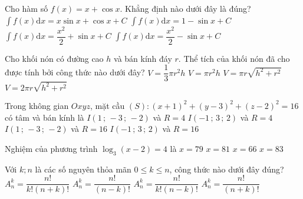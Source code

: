 \begin{ex} %
Cho hàm số $f( x )=x+\cos x$. Khẳng định nào dưới đây là đúng?
\choice 
{ $\int{f( x )\mathrm{d} x}=x\sin x+\cos x+C$}
{ $\int{f( x )\mathrm{d} x}=1-\sin x+C$}
{ \True $\int{f( x )\mathrm{d} x}=\dfrac{x^2}{2}+\sin x+C$}
{ $\int{f( x )\mathrm{d} x}=\dfrac{x^2}{2}-\sin x+C$} 
\end{ex} 
\begin{ex} %
Cho khối nón có đường cao $h$ và bán kính đáy $r$. Thể tích của khối nón đã cho được tính bởi công thức nào dưới đây?
\choice 
{ \True $V=\dfrac{1}{3}\pi {{r}^2}h$}
{ $V=\pi {{r}^2}h$}
{ $V=\pi r\sqrt{{{h}^2}+{{r}^2}}$}
{ $V=2\pi r\sqrt{{{h}^2}+{{r}^2}}$} \end{ex} 
\begin{ex} %
\end{ex} 
\begin{ex} %
Trong không gian $Oxyz$, mặt cầu $( S ):{{( x+1 )}^2}+{{( y-3 )}^2}+{{( z-2 )}^2}=16$ có tâm và bán kính là 
\choice 
{ $I( 1\,;\,-3\,;\,-2 )$ và $R=4$}
{ \True $I( -1\,;\,3\,;\,2 )$ và $R=4$} 
{ $I( 1\,;\,-3\,;\,-2 )$ và $R=16$}
{ $I( -1\,;\,3\,;\,2 )$ và $R=16$} \end{ex} 
\begin{ex} %
Nghiệm của phương trình ${{\log }_{3}}( x-2 )=4$ là
\choice 
{ $x=79$}
{ $x=81$}
{ $x=66$}
{ \True $x=83$} \end{ex} 
\begin{ex} %
Với $k;n$ là các số nguyên thỏa mãn $0\le k\le n$, công thức nào dưới đây đúng?
\choice 
{ $A_{n}^{k}=\dfrac{n!}{k!( n+k )!}$}
{ \True $A_{n}^{k}=\dfrac{n!}{( n-k )!}$} 
{ $A_{n}^{k}=\dfrac{n!}{k!( n-k )!}$}
{ $A_{n}^{k}=\dfrac{n!}{( n+k )!}$} \end{ex} 
